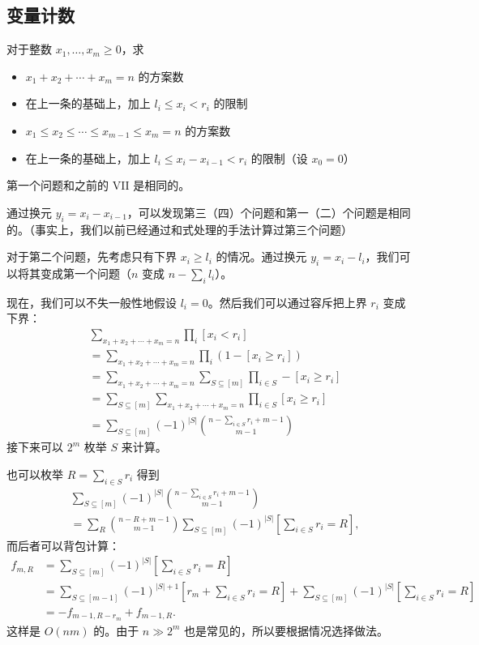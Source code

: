 \subsection{变量计数}
    \begin{example}
    对于整数 $x_1,\ldots,x_m\ge 0$，求

    \begin{itemize}
        \item $x_1+x_2+\cdots+x_m=n$ 的方案数
        \item 在上一条的基础上，加上 $l_i\le x_i< r_i$ 的限制
        \item $x_1\le x_2\le\cdots\le x_{m-1}\le x_m=n$ 的方案数
        \item 在上一条的基础上，加上 $l_i\le x_i-x_{i-1}< r_i$ 的限制（设 $x_0=0$）
    \end{itemize}
    \end{example}
    \begin{solution}
    第一个问题和之前的 VII 是相同的。

    通过换元 $y_i=x_i-x_{i-1}$，可以发现第三（四）个问题和第一（二）个问题是相同的。（事实上，我们以前已经通过和式处理的手法计算过第三个问题）

    对于第二个问题，先考虑只有下界 $x_i\ge l_i$ 的情况。通过换元 $y_i=x_i-l_i$，我们可以将其变成第一个问题（$n$ 变成 $n-\sum_i l_i$）。

    现在，我们可以不失一般性地假设 $l_i=0$。然后我们可以通过容斥把上界 $r_i$ 变成下界：
        $$
    \begin{aligned}
    &\sum_{x_1+x_2+\cdots+x_m=n}\prod_i [x_i<r_i]\\
    &=\sum_{x_1+x_2+\cdots+x_m=n}\prod_i(1-[x_i\ge r_i])\\
    &=\sum_{x_1+x_2+\cdots+x_m=n}\sum_{S\subseteq [m]}\prod_{i\in S}-[x_i\ge r_i]\\
    &=\sum_{S\subseteq [m]}\sum_{x_1+x_2+\cdots+x_m=n}\prod_{i\in S}[x_i\ge r_i]\\
    &=\sum_{S\subseteq [m]}(-1)^{|S|}\binom{n-\sum_{i\in S}r_i+m-1}{m-1}
    \end{aligned}
    $$
    接下来可以 $2^m$ 枚举 $S$ 来计算。

    也可以枚举 $R=\sum_{i\in S}r_i$ 得到
    $$
    \begin{aligned}
    &\sum_{S\subseteq [m]}(-1)^{|S|}\binom{n-\sum_{i\in S}r_i+m-1}{m-1}\\
    &=\sum_R\binom{n-R+m-1}{m-1}\sum_{S\subseteq [m]}(-1)^{|S|}\left[\sum_{i\in S}r_i=R\right],
    \end{aligned}
    $$
    而后者可以背包计算：
    $$
    \begin{aligned}
    f_{m,R}&=\sum_{S\subseteq [m]}(-1)^{|S|}\left[\sum_{i\in S}r_i=R\right]\\
    &=\sum_{S\subseteq [m-1]}(-1)^{|S|+1}\left[r_m+\sum_{i\in S}r_i=R\right]+ \sum_{S\subseteq [m]}(-1)^{|S|}\left[\sum_{i\in S}r_i=R\right]\\
    &=-f_{m-1,R-r_m}+f_{m-1,R}.
    \end{aligned}
    $$
    这样是 $O(nm)$ 的。由于 $n\gg 2^m$ 也是常见的，所以要根据情况选择做法。
    \end{solution}
